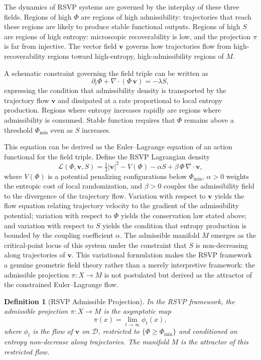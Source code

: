\documentclass[12pt, a4paper]{article}
\theoremstyle{essaystyle}
\newtheorem{definition}{Definition}
\begin{document}
The dynamics of RSVP systems are governed by the interplay of these three fields.
Regions of high $\Phi$ are regions of high admissibility: trajectories that reach these
regions are likely to produce stable functional outputs. Regions of high $S$ are regions
of high entropy: microscopic recoverability is low, and the projection $\pi$ is far
from injective. The vector field $\mathbf{v}$ governs how trajectories flow from
high-recoverability regions toward high-entropy, high-admissibility regions of $M$.

A schematic constraint governing the field triple can be written as
\[
\partial_t \Phi + \nabla \cdot (\Phi\, \mathbf{v}) = -\lambda S,
\]
expressing the condition that admissibility density is transported by the trajectory
flow $\mathbf{v}$ and dissipated at a rate proportional to local entropy production.
Regions where entropy increases rapidly are regions where admissibility is consumed.
Stable function requires that $\Phi$ remains above a threshold $\Phi_{\min}$ even as
$S$ increases.

This equation can be derived as the Euler--Lagrange equation of an action functional
for the field triple. Define the RSVP Lagrangian density
\[
\mathcal{L}(\Phi, \mathbf{v}, S)
= \tfrac{1}{2}|\mathbf{v}|^2 - V(\Phi) - \alpha S + \beta\, \Phi\, \nabla \cdot \mathbf{v},
\]
where $V(\Phi)$ is a potential penalizing configurations below $\Phi_{\min}$,
$\alpha > 0$ weights the entropic cost of local randomization, and $\beta > 0$ couples
the admissibility field to the divergence of the trajectory flow. Variation with respect
to $\mathbf{v}$ yields the flow equation relating trajectory velocity to the gradient
of the admissibility potential; variation with respect to $\Phi$ yields the
conservation law stated above; and variation with respect to $S$ yields the condition
that entropy production is bounded by the coupling coefficient $\alpha$. The admissible
manifold $M$ emerges as the critical-point locus of this system under the constraint
that $S$ is non-decreasing along trajectories of $\mathbf{v}$. This variational
formulation makes the RSVP framework a genuine geometric field theory rather than a
merely interpretive framework: the admissible projection $\pi : X \to M$ is not
postulated but derived as the attractor of the constrained Euler--Lagrange flow.

\begin{definition}[RSVP Admissible Projection]
In the RSVP framework, the admissible projection $\pi : X \to M$ is the asymptotic map
\[
\pi(x) = \lim_{t \to \infty} \phi_t(x),
\]
where $\phi_t$ is the flow of $\mathbf{v}$ on $\mathcal{D}$, restricted to
$\{\Phi \geq \Phi_{\min}\}$ and conditioned on entropy non-decrease along trajectories.
The manifold $M$ is the attractor of this restricted flow.
\end{definition}
\end{document}
